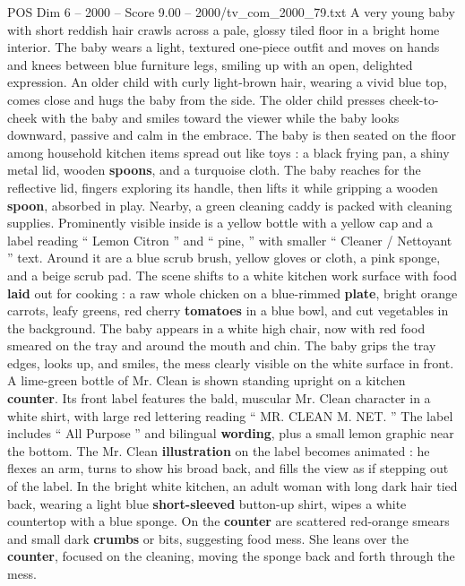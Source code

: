 \begin{textsample}{POS Dim 6 – 2000 – Score 9.00 – 2000/tv\_com\_2000\_79.txt}  \label{ex:f6_pos_054}
A very young baby with short reddish hair crawls across a pale, glossy tiled floor in a bright home interior.
The baby wears a light, textured one-piece outfit and moves on hands and knees between blue furniture legs, smiling up with an open, delighted expression.
An older child with curly light-brown hair, wearing a vivid blue top, comes close and hugs the baby from the side.
The older child presses cheek-to-cheek with the baby and smiles toward the viewer while the baby looks downward, passive and calm in the embrace.
The baby is then seated on the floor among household kitchen items spread out like toys : a black frying pan, a shiny metal lid, wooden \textbf{spoons}, and a turquoise cloth.
The baby reaches for the reflective lid, fingers exploring its handle, then lifts it while gripping a wooden \textbf{spoon}, absorbed in play.
Nearby, a green cleaning caddy is packed with cleaning supplies.
Prominently visible inside is a yellow bottle with a yellow cap and a label reading “ Lemon Citron ” and “ pine, ” with smaller “ Cleaner / Nettoyant ” text.
Around it are a blue scrub brush, yellow gloves or cloth, a pink sponge, and a beige scrub pad.
The scene shifts to a white kitchen work surface with food \textbf{laid} out for cooking : a raw whole chicken on a blue-rimmed \textbf{plate}, bright orange carrots, leafy greens, red cherry \textbf{tomatoes} in a blue bowl, and cut vegetables in the background.
The baby appears in a white high chair, now with red food smeared on the tray and around the mouth and chin.
The baby grips the tray edges, looks up, and smiles, the mess clearly visible on the white surface in front.
A lime-green bottle of Mr.
Clean is shown standing upright on a kitchen \textbf{counter}.
Its front label features the bald, muscular Mr.
Clean character in a white shirt, with large red lettering reading “ MR.
CLEAN M.
NET. ” The label includes “ All Purpose ” and bilingual \textbf{wording}, plus a small lemon graphic near the bottom.
The Mr.
Clean \textbf{illustration} on the label becomes animated : he flexes an arm, turns to show his broad back, and fills the view as if stepping out of the label.
In the bright white kitchen, an adult woman with long dark hair tied back, wearing a light blue \textbf{short-sleeved} button-up shirt, wipes a white countertop with a blue sponge.
On the \textbf{counter} are scattered red-orange smears and small dark \textbf{crumbs} or bits, suggesting food mess.
She leans over the \textbf{counter}, focused on the cleaning, moving the sponge back and forth through the mess.

\end{textsample}
